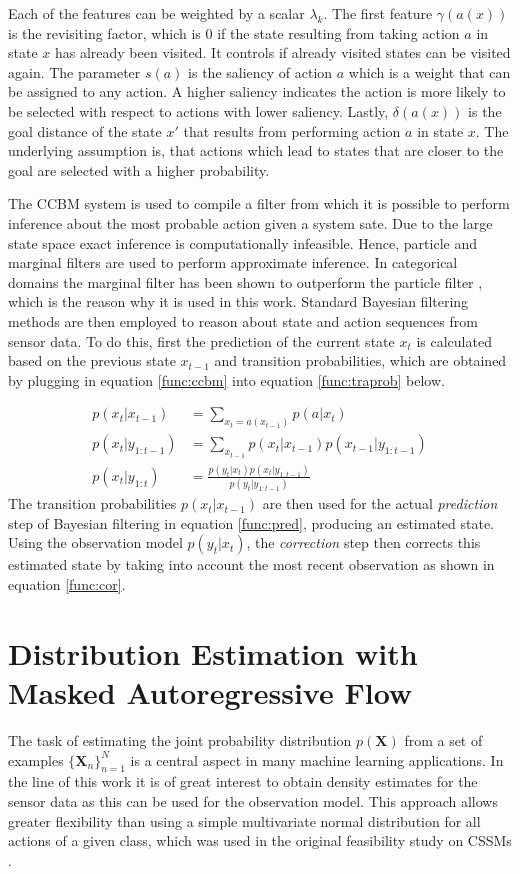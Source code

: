 \documentclass[11pt,titlepage,oneside,openany]{book}
\begin{document}
\noindent Each of the features can be weighted by a scalar $\lambda_k$. The first feature $\gamma(a(x))$ is the revisiting factor, which is 0 if the state resulting from taking action $a$ in state $x$ has already been visited. It controls if already visited states can be visited again. The parameter $s(a)$ is the saliency of action $a$ which is a weight that can be assigned to any action. A higher saliency indicates the action is more likely to be selected with respect to actions with lower saliency. Lastly, $\delta(a(x))$ is the goal distance of the state $x'$ that results from performing action $a$ in state $x$. The underlying assumption is, that actions which lead to states that are closer to the goal are selected with a higher probability.

The CCBM system is used to compile a filter from which it is possible to perform inference about the most probable action given a system sate. Due to the large state space exact inference is computationally infeasible. Hence, particle and marginal filters are used to perform approximate inference. In categorical domains the marginal filter has been shown to outperform the particle filter \cite{kruger_computational_2014}, which is the reason why it is used in this work. Standard Bayesian filtering methods are then employed to reason about state and action sequences from sensor data. To do this, first the prediction of the current state $x_t$ is calculated based on the previous state $x_{t-1}$ and transition probabilities, which are obtained by plugging in equation \ref{func:ccbm} into equation \ref{func:traprob} below.

\begin{align}
	p(x_t|x_{t-1}) &= \sum_{x_t = a(x_{t-1})}^{} p(a|x_t) \label{func:traprob} \\
	p(x_t|y_{1:t-1}) &= \sum_{x_{t-1}} p(x_t|x_{t-1}) p(x_{t-1}|y_{1:t-1}) \label{func:pred} \\
	p(x_t|y_{1:t}) &= \frac{p(y_t|x_t) p(x_t|y_{1:t-1})}{p(y_t|y_{1:t-1})} \label{func:cor}
\end{align}
The transition probabilities $p(x_t|x_{t-1})$ are then used for the actual \emph{prediction} step of Bayesian filtering in equation \ref{func:pred}, producing an estimated state. Using the observation model $p(y_t|x_t)$, the \emph{correction} step then corrects this estimated state by taking into account the most recent observation as shown in equation \ref{func:cor}.

\section{Distribution Estimation with Masked Autoregressive Flow}
\label{sec:maf}
The task of estimating the joint probability distribution $p(\pmb{X})$ from a set of examples $\{\pmb{X}_n\}^N_{n=1}$ is a central aspect in many machine learning applications. In the line of this work it is of great interest to obtain density estimates for the sensor data as this can be used for the observation model. This approach allows greater flexibility than using a simple multivariate normal distribution for all actions of a given class, which was used in the original feasibility study on CSSMs \cite{kruger_computational_2014}.
\end{document}
